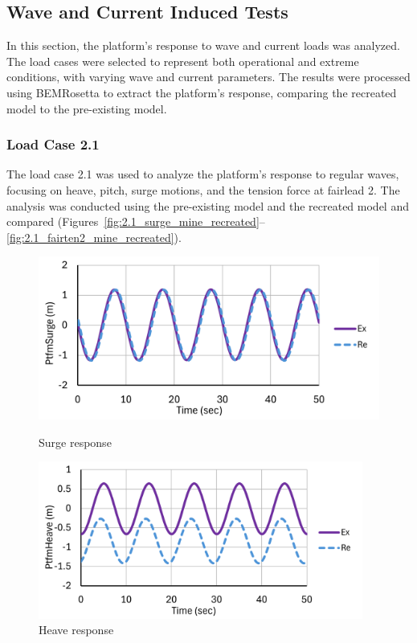 \documentclass[a4paper, 11pt]{article}
\begin{document}
\subsection{Wave and Current Induced Tests}
\hspace*{0.5cm}In this section, the platform's response to wave and current loads was analyzed. The load cases were selected to represent both operational and extreme conditions, with varying wave and current parameters. The results were processed using BEMRosetta to extract the platform's response, comparing the recreated model to the pre-existing model.

\subsubsection{Load Case 2.1}
\hspace*{0.5cm}The load case 2.1 was used to analyze the platform’s response to regular waves, focusing on heave, pitch, surge motions, and the tension force at fairlead 2. The analysis was conducted using the pre-existing model and the recreated model and compared (Figures~\ref{fig:2.1_surge_mine_recreated}--\ref{fig:2.1_fairten2_mine_recreated}).

\begin{figure}[H]
    \begin{minipage}{0.48\textwidth}
        \centering
        \includegraphics[width=1\textwidth]{2.1_surge_mine_1.png}
        \caption{\small Surge response}
        \label{fig:2.1_surge_mine_recreated}
    \end{minipage}
    \hfill
    \begin{minipage}{0.5\textwidth}
        \centering
        \includegraphics[width=0.95\textwidth]{2.1_heave_mine_1.png}
        \caption{\small Heave response}
        \label{fig:2.1_heave_mine_recreated}
    \end{minipage}
\end{figure}
\end{document}

